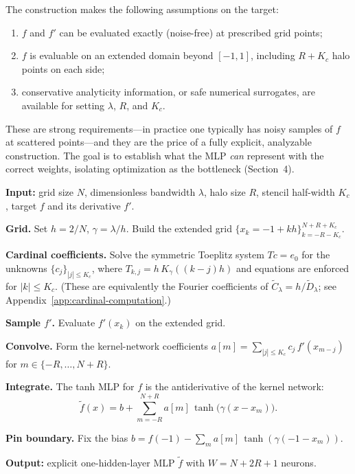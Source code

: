 \documentclass{article}
\begin{document}
The construction makes the following assumptions on the target:
\begin{enumerate}
  \item[(i)] \(f\) and \(f'\) can be evaluated exactly (noise-free) at prescribed grid points;
  \item[(ii)] \(f\) is evaluable on an extended domain beyond \([-1,1]\), including \(R + K_c\) halo points on each side;
  \item[(iii)] conservative analyticity information, or safe numerical surrogates, are available for setting \(\lambda\), \(R\), and \(K_c\).
\end{enumerate}
These are strong requirements---in practice one typically has noisy samples of \(f\) at scattered points---and they are the price of a fully explicit, analyzable construction.  The goal is to establish what the MLP \emph{can} represent with the correct weights, isolating optimization as the bottleneck (Section~4).

\begin{algorithm}[t]
\caption{Explicit Quasi-Interpolant MLP Construction (tanh)}
\label{alg:qi-mlp}
\small
\begin{algorithmic}[1]
\Statex \textbf{Input:} grid size \(N\), dimensionless bandwidth \(\lambda\), halo size \(R\), stencil half-width \(K_c\), target \(f\) and its derivative \(f'\).

\State \textbf{Grid.} Set \(h = 2/N\), \(\gamma = \lambda/h\). Build the extended grid \(\{x_k = -1 + kh\}_{k=-R-K_c}^{N+R+K_c}\).

\State \textbf{Cardinal coefficients.} Solve the symmetric Toeplitz system \(Tc = e_0\) for the unknowns \(\{c_j\}_{|j|\le K_c}\), where \(T_{k,j} = h\,K_\gamma((k-j)h)\) and equations are enforced for \(|k|\le K_c\).  (These are equivalently the Fourier coefficients of \(\widetilde{C}_\lambda = h/\widetilde{D}_\lambda\); see Appendix~\ref{app:cardinal-computation}.)

\State \textbf{Sample \(f'\).} Evaluate \(f'(x_k)\) on the extended grid.

\State \textbf{Convolve.} Form the kernel-network coefficients \(a[m] = \sum_{|j|\le K_c} c_j\,f'(x_{m-j})\) for \(m\in\{-R,\ldots,N{+}R\}\).

\State \textbf{Integrate.} The tanh MLP for \(f\) is the antiderivative of the kernel network:
\[
  \widetilde{f}(x) = b + \sum_{m=-R}^{N+R} a[m]\,\tanh\big(\gamma(x-x_m)\big).
\]

\State \textbf{Pin boundary.} Fix the bias \(b = f(-1) - \sum_m a[m]\,\tanh(\gamma(-1-x_m))\).

\Statex \textbf{Output:} explicit one-hidden-layer MLP \(\widetilde{f}\) with \(W = N + 2R + 1\) neurons.
\end{algorithmic}
\end{algorithm}
\end{document}
